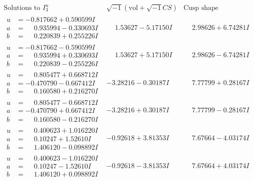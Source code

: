 \documentclass[1p]{elsarticle_modified}
\theoremstyle{definition}
\newcommand{\I}{\sqrt{-1}}
\begin{document}
$$\begin{array}{c|c|c}  
\text{Solutions to }I^u_{3}& \I (\text{vol} + \sqrt{-1}CS) & \text{Cusp shape}\\
 \hline 
\begin{aligned}
u &= -0.817662 + 0.590599 I \\
a &= \phantom{-}0.935994 - 0.330693 I \\
b &= \phantom{-}0.220839 + 0.255226 I\end{aligned}
 & \phantom{-}1.53627 - 5.17150 I & \phantom{-}2.98626 + 6.74281 I \\ \hline\begin{aligned}
u &= -0.817662 - 0.590599 I \\
a &= \phantom{-}0.935994 + 0.330693 I \\
b &= \phantom{-}0.220839 - 0.255226 I\end{aligned}
 & \phantom{-}1.53627 + 5.17150 I & \phantom{-}2.98626 - 6.74281 I \\ \hline\begin{aligned}
u &= \phantom{-}0.805477 + 0.668712 I \\
a &= -0.470790 - 0.667412 I \\
b &= \phantom{-}0.160580 + 0.216270 I\end{aligned}
 & -3.28216 - 0.30187 I & \phantom{-}7.77799 + 0.28167 I \\ \hline\begin{aligned}
u &= \phantom{-}0.805477 - 0.668712 I \\
a &= -0.470790 + 0.667412 I \\
b &= \phantom{-}0.160580 - 0.216270 I\end{aligned}
 & -3.28216 + 0.30187 I & \phantom{-}7.77799 - 0.28167 I \\ \hline\begin{aligned}
u &= \phantom{-}0.400623 + 1.016220 I \\
a &= \phantom{-}0.10247 + 1.52610 I \\
b &= \phantom{-}1.406120 - 0.098892 I\end{aligned}
 & -0.92618 + 3.81353 I & \phantom{-}7.67664 - 4.03174 I \\ \hline\begin{aligned}
u &= \phantom{-}0.400623 - 1.016220 I \\
a &= \phantom{-}0.10247 - 1.52610 I \\
b &= \phantom{-}1.406120 + 0.098892 I\end{aligned}
 & -0.92618 - 3.81353 I & \phantom{-}7.67664 + 4.03174 I \\ \hline\begin{aligned}

\end{aligned}
\end{array}$$
\end{document}
